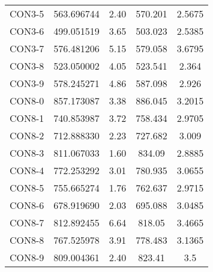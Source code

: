 \begin{table}[ht]
\begin{tabular}{c c c c c}
CON3-5 & 563.696744 & 2.40 & 570.201 & 2.5675 \\
CON3-6 & 499.051519 & 3.65 & 503.023 & 2.5385 \\
CON3-7 & 576.481206 & 5.15 & 579.058 & 3.6795 \\
CON3-8 & 523.050002 & 4.05 & 523.541 & 2.364 \\
CON3-9 & 578.245271 & 4.86 & 587.098 & 2.926 \\
CON8-0 & 857.173087 & 3.38 & 886.045 & 3.2015 \\
CON8-1 & 740.853987 & 3.72 & 758.434 & 2.9705 \\
CON8-2 & 712.888330 & 2.23 & 727.682 & 3.009 \\
CON8-3 & 811.067033 & 1.60 & 834.09 & 2.8885 \\
CON8-4 & 772.253292 & 3.01 & 780.935 & 3.0655 \\
CON8-5 & 755.665274 & 1.76 & 762.637 & 2.9715 \\
CON8-6 & 678.919690 & 2.03 & 695.088 & 3.0485 \\
CON8-7 & 812.892455 & 6.64 & 818.05 & 3.4665 \\
CON8-8 & 767.525978 & 3.91 & 778.483 & 3.1365 \\
CON8-9 & 809.004361 & 2.40 & 823.41 & 3.5 \\
[1ex]\hline
\end{tabular}
\label{table:nonlin}
\end{table} \clearpage
